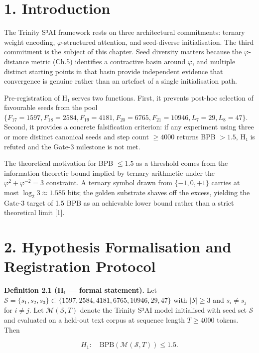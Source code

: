 \section{1. Introduction}\label{fa_11:introduction}

The Trinity S³AI framework rests on three
architectural commitments: ternary weight
encoding, \(\varphi\)-structured attention, and
seed-diverse initialisation. The third commitment
is the subject of this chapter. Seed diversity
matters because the \(\varphi\)-distance metric
(Ch.5) identifies a contractive basin around
\(\varphi\), and multiple distinct starting points
in that basin provide independent evidence that
convergence is genuine rather than an artefact of
a single initialisation path.

Pre-registration of H₁ serves two functions.
First, it prevents post-hoc selection of
favourable seeds from the pool
\(\{F_{17}=1597, F_{18}=2584, F_{19}=4181, F_{20}=6765, F_{21}=10946, L_7=29, L_8=47\}\).
Second, it provides a concrete falsification
criterion: if any experiment using three or more
distinct canonical seeds and step count
\(\geq 4000\) returns BPB \(> 1.5\), H₁ is refuted
and the Gate-3 milestone is not met.

The theoretical motivation for BPB \(\leq 1.5\) as
a threshold comes from the information-theoretic
bound implied by ternary arithmetic under the
\(\varphi^2 + \varphi^{-2} = 3\) constraint. A
ternary symbol drawn from \(\{-1, 0, +1\}\)
carries at most \(\log_2 3 \approx 1.585\) bits;
the golden substrate shaves off the excess,
yielding the Gate-3 target of 1.5 BPB as an
achievable lower bound rather than a strict
theoretical limit [1].

\section{2. Hypothesis Formalisation and
Registration
Protocol}\label{fa_11:hypothesis-formalisation-and-registration-protocol}

\textbf{Definition 2.1 (H₁ --- formal statement).}
Let
\(\mathcal{S} = \{s_1, s_2, s_3\} \subset \{1597, 2584, 4181, 6765, 10946, 29, 47\}\)
with \(|\mathcal{S}| \geq 3\) and \(s_i \neq s_j\)
for \(i \neq j\). Let
\(\mathcal{M}(\mathcal{S}, T)\) denote the Trinity
S³AI model initialised with seed set
\(\mathcal{S}\) and evaluated on a held-out text
corpus at sequence length \(T \geq 4000\) tokens.
Then

\[H_1: \quad \text{BPB}(\mathcal{M}(\mathcal{S}, T)) \leq 1.5.\]

